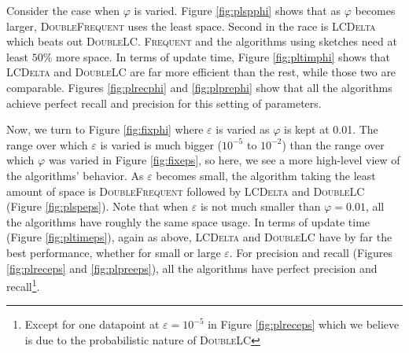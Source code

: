 \documentclass[sigconf,review=true,anonymous=true,screen]{acmart}
\newcommand{\eps}{\varepsilon}
\renewcommand{\phi}{\varphi}
\begin{document}
Consider the case when $\phi$ is varied. Figure \ref{fig:plspphi} shows that as $\phi$ becomes larger, \textsc{DoubleFrequent} uses the least space.
Second in the race is \textsc{LCDelta} which beats out \textsc{DoubleLC}. \textsc{Frequent} and the algorithms using sketches need at least $50\%$ 
more space. In terms of update time, Figure \ref{fig:pltimphi} shows that \textsc{LCDelta} and \textsc{DoubleLC} are far more efficient than the rest,
while those two are comparable. Figures \ref{fig:plrecphi} and \ref{fig:plprephi} show that all the algorithms achieve perfect recall and precision for this setting of parameters.

Now, we turn to Figure \ref{fig:fixphi} where $\eps$ is varied as $\phi$ is kept at 0.01. The range over which $\eps$ is varied is much bigger ($10^{-5}$ to $10^{-2}$) than the range over which $\phi$ was varied in Figure \ref{fig:fixeps}, so here, we see a more high-level view of the algorithms' behavior. As $\eps$ becomes small, the algorithm taking the least amount of space is \textsc{DoubleFrequent} followed by \textsc{LCDelta} and \textsc{DoubleLC} (Figure \ref{fig:plspeps}). Note that when $\eps$ is not much smaller than $\phi=0.01$, all the algorithms have roughly the same space usage.  In terms of update time (Figure \ref{fig:pltimeps}), again as above, \textsc{LCDelta} and \textsc{DoubleLC} have by far the best performance, whether for small or large $\eps$. For precision and recall (Figures \ref{fig:plreceps} and \ref{fig:plpreeps}), all the algorithms have perfect precision and recall\footnote{Except for one datapoint at $\eps=10^{-5}$ in Figure \ref{fig:plreceps} which we believe is due to the probabilistic nature of \textsc{DoubleLC}}.
\end{document}
